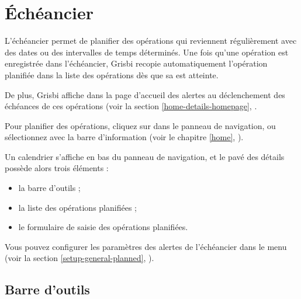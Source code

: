 
\chapter{Échéancier\label{plannedtransactions}}

L'échéancier permet de planifier des opérations qui reviennent régulièrement avec des dates ou des intervalles de temps déterminés. Une fois qu'une opération est enregistrée dans l'échéancier, Grisbi recopie automatiquement l'opération planifiée dans la liste des opérations dès que sa  est atteinte. 

De plus, Grisbi affiche dans la page d'accueil des alertes au déclenchement des échéances de ces opérations (voir la section \vref{home-details-homepage}, .

Pour planifier des opérations, cliquez sur  dans le panneau de navigation, ou sélectionnez  avec la barre d'information (voir le chapitre \vref{home}, ).

Un calendrier s'affiche en bas du panneau de navigation, et le pavé des détails possède alors trois éléments :
\begin{itemize}
	 \item la barre d'outils ;
	 \item la liste des opérations planifiées ;
	 \item le formulaire de saisie des opérations planifiées.
\end{itemize}

Vous pouvez configurer les paramètres des alertes de l'échéancier dans le menu  (voir la section \vref{setup-general-planned}, ).


\section{Barre d'outils\label{plannedtransactions-functions}}


